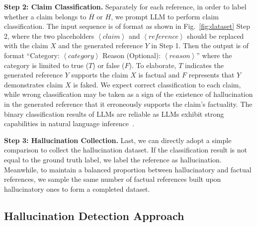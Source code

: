 \textbf{Step 2: Claim Classification.} Separately for each reference, in order to label 
whether a claim belongs to $\overline{H}$ or $H$, we prompt LLM to perform claim classification. %
The input sequence is of format as shown in Fig.~\ref{fig:dataset} Step 2, where the two placeholders $\left\langle claim \right\rangle$ and $\left\langle reference\right\rangle$ should be replaced with the claim $X$ and the generated reference $Y$ in Step 1. 
Then the output is of format ``Category: $\left\langle category\right\rangle$ Reason (Optional): $ \left\langle reason\right\rangle$” where the category is limited to true ($T$) or false ($F$). 
To elaborate, $T$ indicates the generated reference $Y$ supports the claim $X$ is factual and $F$ represents that $Y$ demonstrates claim $X$ is faked. %
We expect correct classification to each claim, while wrong classification may be taken as a sign of the existence of hallucination in the generated reference that it erroneously supports the claim's factuality. The binary classification results of LLMs are reliable as LLMs exhibit strong capabilities in natural language inference~\citep{wu2023exploring}.

\textbf{Step 3: Hallucination Collection.}
Last, we can directly adopt a simple comparison to collect the hallucination dataset. 
If the classification result is not equal to the ground truth label, we label the reference as hallucination. 
Meanwhile, to maintain a balanced proportion between hallucinatory and factual references, we sample the same number of factual references built upon hallucinatory ones to form a completed dataset.

\subsection{Hallucination Detection Approach}

